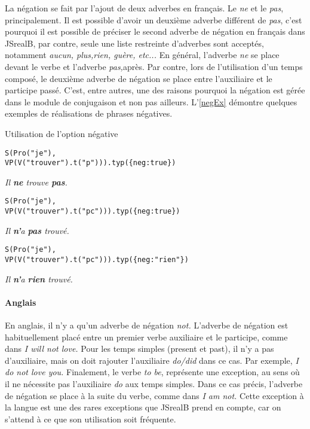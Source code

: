 \documentclass[11pt]{article} %
\newcommand{\system}[1]{\textsf{#1}}
\newcommand{\JSB}{\system{JSrealB}}
\newcommand{\real}[1]{\emph{#1}}
\begin{document}
La négation se fait par l'ajout de deux adverbes en français. Le \emph{ne}
et le \emph{pas}, principalement. Il est possible d'avoir un
deuxième adverbe différent de \emph{pas}, c'est pourquoi il est possible
de préciser le second adverbe de négation en français dans \JSB{},
par contre, seule une liste restreinte d'adverbes sont acceptés, notamment
\emph{aucun, plus,rien, guère, etc... }En général, l'adverbe
\emph{ne }se place devant le verbe et l'adverbe \emph{pas,}après.
Par contre, lors de l'utilisation d'un temps composé, le deuxième
adverbe de négation se place entre l'auxiliaire et le participe passé.
C'est, entre autres, une des raisons pourquoi la négation est gérée
dans le module de conjugaison et non pas ailleurs. L'\autoref{negEx} démontre quelques
exemples de réalisations de phrases négatives.
\begin{example}
\caption{Utilisation de l'option négative}
\begin{alltt}
S(Pro("je"),
  VP(V("trouver").t("p"))).typ(\{neg:true\})
\end{alltt}
\real{Il \textbf{ne} trouve \textbf{pas}.}\\

\begin{alltt}
S(Pro("je"),
  VP(V("trouver").t("pc"))).typ(\{neg:true\})
\end{alltt}
\real{Il \textbf{n'}a \textbf{pas} trouvé.}\\

\begin{alltt}
S(Pro("je"),
  VP(V("trouver").t("pc"))).typ(\{neg:"rien"\})
\end{alltt}
\real{Il \textbf{n'}a \textbf{rien} trouvé.}\\
\label{negEx}
\end{example}

\paragraph{Anglais}

En anglais, il n'y a qu'un adverbe de négation 
\emph{not. }L'adverbe de négation est habituellement placé entre un
premier verbe auxiliaire et le participe, comme dans \emph{I will
not love. }Pour les temps simples (present et past), il n'y a pas d'auxiliaire,
mais on doit rajouter l'auxiliaire \emph{do/did} dans ce cas. Par
exemple, \emph{I do not love you. }Finalement, le verbe \emph{to be},
représente une exception, au sens où il ne nécessite pas l'auxiliaire
\emph{do }aux temps simples. Dans ce cas précis, l'adverbe de négation
se place à la suite du verbe, comme dans \emph{I am not.} Cette exception
à la langue est une des rares exceptions que \JSB{} prend en compte,
car on s'attend à ce que son utilisation soit fréquente.
\end{document}
